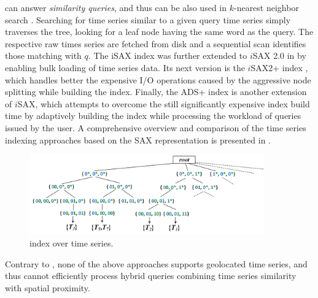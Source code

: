 \isax can answer {\em similarity queries}, and thus can be also used in $k$-nearest neighbor search \cite{shieh2008kdd}. Searching for time series similar to a given query time series simply traverses the \isax tree, looking for a leaf node having the same \isax word as the query. The respective raw times series are fetched from disk and a sequential scan identifies those matching with $q$. The iSAX index was further extended to $i$SAX 2.0 in \cite{camerra2010icdm} by enabling bulk loading of time series data. Its next version is the $i$SAX2+ index \cite{camerra2014kais}, which handles better the expensive I/O operations caused by the aggressive node splitting while building the index. Finally, the ADS+ index \cite{zoumpatianos2014sigmod} is another extension of $i$SAX, which attempts to overcome the still significantly expensive index build time by adaptively building the index while processing the workload of queries issued by the user. A comprehensive overview and comparison of the time series indexing approaches based on the SAX representation is presented in \cite{palpanas2016bigsm}.

\begin{figure}[tb]
 \centering
 \includegraphics[width=0.9\textwidth]{figures/isax_tree2.png}
 \caption{\isax index over time series.}
 \label{fig:isaxtree}
\end{figure}

Contrary to \btsr, none of the above approaches supports geolocated time series, and thus cannot efficiently process hybrid queries combining time series similarity with spatial proximity.

